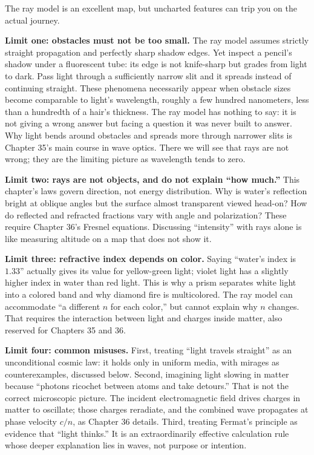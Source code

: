 
The ray model is an excellent map, but uncharted features can trip you on the actual journey.

\textbf{Limit one: obstacles must not be too small.} The ray model assumes strictly straight propagation and perfectly sharp shadow edges. Yet inspect a pencil's shadow under a fluorescent tube: its edge is not knife-sharp but grades from light to dark. Pass light through a sufficiently narrow slit and it spreads instead of continuing straight. These phenomena necessarily appear when obstacle sizes become comparable to light's wavelength, roughly a few hundred nanometers, less than a hundredth of a hair's thickness. The ray model has nothing to say: it is not giving a wrong answer but facing a question it was never built to answer. Why light bends around obstacles and spreads more through narrower slits is Chapter 35's main course in wave optics. There we will see that rays are not wrong; they are the limiting picture as wavelength tends to zero.

\textbf{Limit two: rays are not objects, and do not explain ``how much.''} This chapter's laws govern direction, not energy distribution. Why is water's reflection bright at oblique angles but the surface almost transparent viewed head-on? How do reflected and refracted fractions vary with angle and polarization? These require Chapter 36's Fresnel equations. Discussing ``intensity'' with rays alone is like measuring altitude on a map that does not show it.

\textbf{Limit three: refractive index depends on color.} Saying ``water's index is \(1.33\)'' actually gives its value for yellow-green light; violet light has a slightly higher index in water than red light. This is why a prism separates white light into a colored band and why diamond fire is multicolored. The ray model can accommodate ``a different \(n\) for each color,'' but cannot explain why \(n\) changes. That requires the interaction between light and charges inside matter, also reserved for Chapters 35 and 36.

\textbf{Limit four: common misuses.} First, treating ``light travels straight'' as an unconditional cosmic law: it holds only in uniform media, with mirages as counterexamples, discussed below. Second, imagining light slowing in matter because ``photons ricochet between atoms and take detours.'' That is not the correct microscopic picture. The incident electromagnetic field drives charges in matter to oscillate; those charges reradiate, and the combined wave propagates at phase velocity \(c/n\), as Chapter 36 details. Third, treating Fermat's principle as evidence that ``light thinks.'' It is an extraordinarily effective calculation rule whose deeper explanation lies in waves, not purpose or intention.

